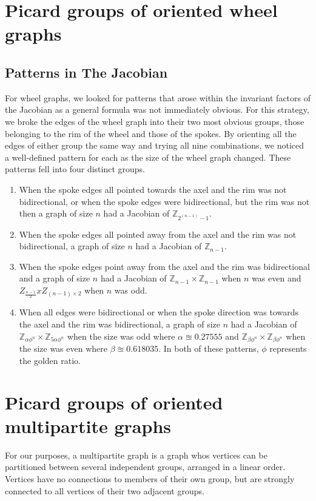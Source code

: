 \documentclass[11pt,reqno]{amsart}
\theoremstyle{definition}
\theoremstyle{plain}
\begin{document}
\section{Picard groups of oriented wheel graphs}

	\subsection{Patterns in The Jacobian}
		For wheel graphs, we looked for patterns that arose within the invariant factors of the Jacobian as
		a general formula was not immediately obvious.  For this strategy, we broke the edges of the wheel graph into
		their two most obvious groups, those belonging to the rim of the wheel and those of the spokes.  By orienting
		all the edges of either group the same way and trying all nine combinations, we noticed a well-defined pattern
		for each as the size of the wheel graph changed.  These patterns fell into four distinct groups.

		\begin{enumerate}
			\item When the spoke edges all pointed towards the axel and the rim was not bidirectional, or when
				the spoke edges were bidirectional, but the rim was not then a graph of size $n$ had a
				Jacobian of $\mathbb{Z}_{2^(n-1)-1}$.
			\item When the spoke edges all pointed away from the axel and the rim was not bidirectional,
				a graph of size $n$ had a Jacobian of $\mathbb{Z}_{n-1}$.
			\item When the spoke edges point away from the axel and the rim was bidirectional and a graph of size
				$n$ had a Jacobian of $\mathbb{Z}_{n-1} \times \mathbb{Z}_{n-1}$ when $n$ was even
				and $Z_{\frac{n-1}{2}} x Z_{(n-1) \times 2}$ when $n$ was odd.
			\item When all edges were bidirectional or when the spoke direction was towards the axel and
				the rim was bidirectional, a graph of size $n$ had a Jacobian of
				$\mathbb{Z}_{\alpha\phi^{n}} \times \mathbb{Z}_{5\alpha\phi^{n}}$ when the size
				was odd where $\alpha \approxeq 0.27555$ and $\mathbb{Z}_{\beta\phi^{n}} \times \mathbb{Z}_{\beta\phi^{n}}$
				when the size was even where $\beta \approxeq 0.618035$. In both of these patterns,
				$\phi$ represents the golden ratio.
		\end{enumerate}

\section{Picard groups of oriented multipartite graphs}
	For our purposes, a multipartite graph is a graph whos vertices can be partitioned between several independent
	groups, arranged in a linear order.  Vertices have no connections to members of their own group, but are strongly
	connected to all vertices of their two adjacent groups.
\end{document}
